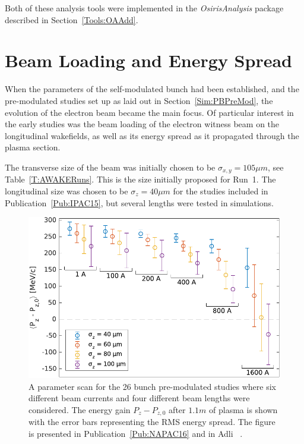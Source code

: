 Both of these analysis tools were implemented in the \textit{OsirisAnalysis} package described in Section~\ref{Tools:OAAdd}.

\section{Beam Loading and Energy Spread}
\label{SimA:BLoad}

When the parameters of the self-modulated bunch had been established, and the pre-modulated studies set up as laid out in Section~\ref{Sim:PBPreMod}, the evolution of the electron beam became the main focus.
Of particular interest in the early studies was the beam loading of the electron witness beam on the longitudinal wakefields, as well as its energy spread as it propagated through the plasma section.

The transverse size of the beam was initially chosen to be $\sigma_{x,y}=105\unit{\mu m}$, see Table~\ref{T:AWAKERuns}.
This is the size initially proposed for Run~1.
The longitudinal size was chosen to be $\sigma_{z}=40\unit{\mu m}$ for the studies included in Publication~\ref{Pub:IPAC15}, but several lengths were tested in simulations.

\begin{figure}[hbt]
    \centering
    \includegraphics[width=0.625\linewidth]{figures/NAPACEGainSpreadScan}
    \caption{\label{Fig:SimA:BLoadScan}
        A parameter scan for the 26 bunch pre-modulated studies where six different beam currents and four different beam lengths were considered.
        The energy gain $P_{z} - P_{z,0}$ after $1.1\unit{m}$ of plasma is shown with the error bars representing the RMS energy spread.
        The figure is presented in Publication~\ref{Pub:NAPAC16} and in Adli \etal~\cite{adli:2016a}.
    }
\end{figure}

